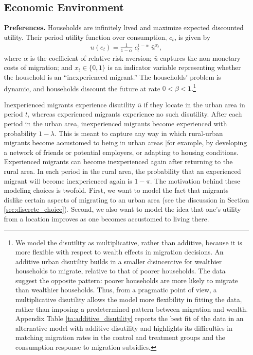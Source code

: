 \documentclass[12pt,pdftex]{article}
\begin{document}
\subsection{Economic Environment}

\textbf{Preferences.} Households are infinitely lived and maximize expected discounted utility. Their period utility function over consumption, $c_t$, is given by
\begin{align}
u(c_t) = \frac{1}{1-\alpha} \; c_t^{1-\alpha} \; \bar u^{x_t},
\label{eq:utility}
\end{align}
where $\alpha$ is the coefficient of relative risk aversion; $\bar u$ captures the non-monetary costs of migration; and $x_t \in \{0,1\}$ is an indicator variable representing whether the household is an ``inexperienced migrant.'' The households' problem is dynamic, and households discount the future at rate $0<\beta<1.$\footnote{We model the disutility as multiplicative, rather than additive, because it is more flexible with respect to wealth effects in migration decisions. An additive urban disutility builds in a smaller disincentive for wealthier households to migrate, relative to that of poorer households. The data suggest the opposite pattern: poorer households are more likely to migrate than wealthier households. Thus, from a pragmatic point of view, a multiplicative disutility allows the model more flexibility in fitting the data, rather than imposing a predetermined pattern between migration and wealth. Appendix Table \ref{ta:additive_disutility} reports the best fit of the data in an alternative model with additive disutility and highlights its difficulties in matching migration rates in the control and treatment groups and the consumption response to migration subsidies.}

Inexperienced migrants experience disutility $\bar u$ if they locate in the urban area in period $t$, whereas experienced migrants experience no such disutility. After each period in the urban area, inexperienced migrants become experienced with probability $1-\lambda$. This is meant to capture any way in which rural-urban migrants become accustomed to being in urban areas |for example, by developing a network of friends or potential employers, or adapting to housing conditions. Experienced migrants can become inexperienced again after returning to the rural area. In each period in the rural area, the probability that an experienced migrant will become inexperienced again is $1-\pi$. The motivation behind these modeling choices is twofold. First, we want to model the fact that migrants dislike certain aspects of migrating to an urban area (see the discussion in Section \ref{sec:discrete_choice}). Second, we also want to model the idea that one's utility from a location improves as one becomes accustomed to living there.
\end{document}
